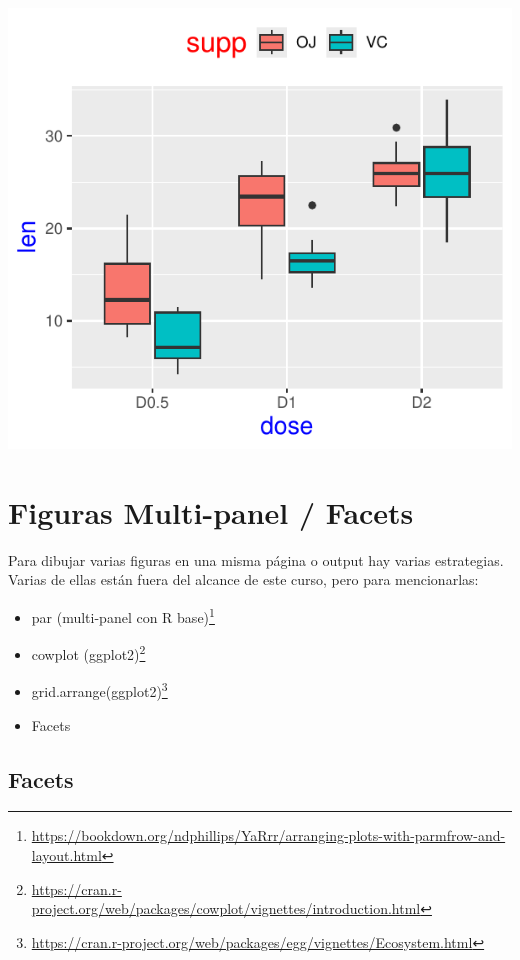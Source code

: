 \documentclass[
]{book}
\begin{document}
\begin{center}\includegraphics{_main_files/figure-latex/unnamed-chunk-219-1} \end{center}

\section{Figuras Multi-panel / Facets}\label{figuras-multi-panel-facets}

Para dibujar varias figuras en una misma página o output hay varias estrategias.
Varias de ellas están fuera del alcance de este curso, pero para mencionarlas:

\begin{itemize}
\item
  par (multi-panel con R base)\footnote{\url{https://bookdown.org/ndphillips/YaRrr/arranging-plots-with-parmfrow-and-layout.html}}
\item
  cowplot (ggplot2)\footnote{\url{https://cran.r-project.org/web/packages/cowplot/vignettes/introduction.html}}
\item
  grid.arrange(ggplot2)\footnote{\url{https://cran.r-project.org/web/packages/egg/vignettes/Ecosystem.html}}
\item
  Facets
\end{itemize}

\subsection{Facets}\label{facets}
\end{document}
